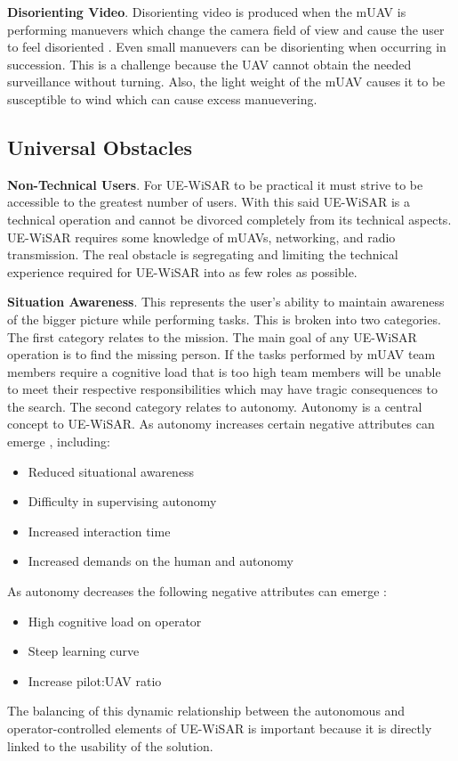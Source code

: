 \textbf{Disorienting Video}.  Disorienting video is produced when the mUAV is
performing manuevers which change the camera field of view and cause the user to feel
disoriented \cite{morse2008application}.  Even small manuevers can be
disorienting when occurring in succession.
This is a challenge because the UAV cannot obtain the needed surveillance
without turning.  Also, the light weight of the mUAV causes it to be
susceptible to wind which can cause excess manuevering.

\subsection{Universal Obstacles}
\textbf{Non-Technical Users}.  For UE-WiSAR to be
practical it must strive to be accessible to the greatest number of users.  With
this said UE-WiSAR is a technical operation and cannot be divorced completely
from its technical aspects.  UE-WiSAR requires some knowledge of mUAVs,
networking, and radio transmission. The real obstacle is segregating
and limiting the technical experience required for UE-WiSAR into as few roles as
possible.

\textbf{Situation Awareness}.  This represents the user's ability to maintain
awareness of the bigger picture while performing tasks.  This is broken into
two categories.  The first category relates to the mission.  The main goal of
any UE-WiSAR operation is to find the missing person.  If the tasks performed by
mUAV team members require a cognitive load that is too high team members will be
unable to meet their respective responsibilities which may have tragic
consequences to the search.  The second category relates to autonomy.  Autonomy
is a central concept to UE-WiSAR.  As autonomy increases certain negative
attributes can emerge  \cite{adams2007camera}, including:
\begin{itemize}
	\item Reduced situational awareness
	\item Difficulty in supervising autonomy
	\item Increased interaction time
	\item Increased demands on the human and autonomy
\end{itemize}
As autonomy decreases the following negative attributes
can emerge \cite{cooper2006integrating}:
\begin{itemize}
	\item High cognitive load on operator
	\item Steep learning curve
	\item Increase pilot:UAV ratio
\end{itemize}
The balancing of this dynamic relationship between the autonomous and
operator-controlled elements of UE-WiSAR is important because it is directly
linked to the usability of the solution.

